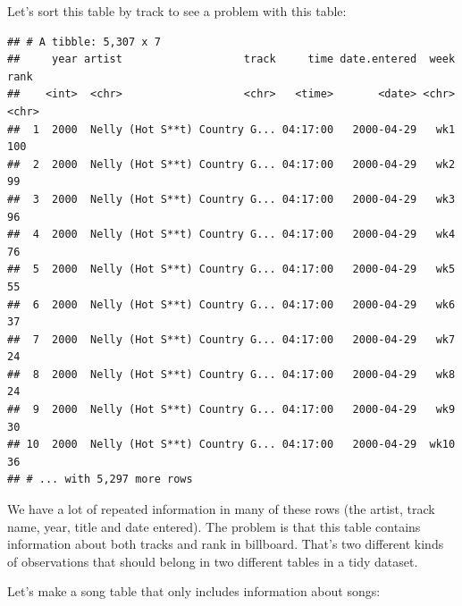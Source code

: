 \documentclass[]{article}
\newenvironment{Shaded}{\begin{snugshade}}{\end{snugshade}}
\newcommand{\KeywordTok}[1]{\textcolor[rgb]{0.13,0.29,0.53}{\textbf{{#1}}}}
\newcommand{\StringTok}[1]{\textcolor[rgb]{0.31,0.60,0.02}{{#1}}}
\newcommand{\NormalTok}[1]{{#1}}
\theoremstyle{definition}
\theoremstyle{definition}
\theoremstyle{remark}
\begin{document}
Let's sort this table by track to see a problem with this table:

\begin{Shaded}
\end{Shaded}

\begin{verbatim}
## # A tibble: 5,307 x 7
##     year artist                   track     time date.entered  week  rank
##    <int>  <chr>                   <chr>   <time>       <date> <chr> <chr>
##  1  2000  Nelly (Hot S**t) Country G... 04:17:00   2000-04-29   wk1   100
##  2  2000  Nelly (Hot S**t) Country G... 04:17:00   2000-04-29   wk2    99
##  3  2000  Nelly (Hot S**t) Country G... 04:17:00   2000-04-29   wk3    96
##  4  2000  Nelly (Hot S**t) Country G... 04:17:00   2000-04-29   wk4    76
##  5  2000  Nelly (Hot S**t) Country G... 04:17:00   2000-04-29   wk5    55
##  6  2000  Nelly (Hot S**t) Country G... 04:17:00   2000-04-29   wk6    37
##  7  2000  Nelly (Hot S**t) Country G... 04:17:00   2000-04-29   wk7    24
##  8  2000  Nelly (Hot S**t) Country G... 04:17:00   2000-04-29   wk8    24
##  9  2000  Nelly (Hot S**t) Country G... 04:17:00   2000-04-29   wk9    30
## 10  2000  Nelly (Hot S**t) Country G... 04:17:00   2000-04-29  wk10    36
## # ... with 5,297 more rows
\end{verbatim}

We have a lot of repeated information in many of these rows (the artist,
track name, year, title and date entered). The problem is that this
table contains information about both tracks and rank in billboard.
That's two different kinds of observations that should belong in two
different tables in a tidy dataset.

Let's make a song table that only includes information about songs:

\begin{Shaded}
\end{Shaded}
\end{document}
